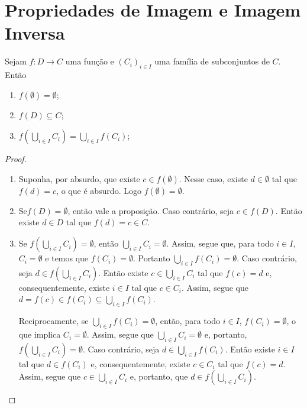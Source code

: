 \section{Propriedades de Imagem e Imagem Inversa}

\begin{prop}
	Sejam $f: D \to C$ uma função e $(C_i)_{i \in I}$ uma família de subconjuntos de $C$. Então
	\begin{enumerate}
	\item $f(\emptyset) = \emptyset$;
	\item $f(D) \subseteq C$;
	\item $f\left(\displaystyle\bigcup_{i \in I} C_i \right) = \displaystyle\bigcup_{i \in I} f(C_i)$;
	\end{enumerate}
\end{prop}
\begin{proof}
	\begin{enumerate}
	\item Suponha, por absurdo, que existe $c \in f(\emptyset)$. Nesse caso, existe $d \in \emptyset$ tal que $f(d) = c$, o que é absurdo. Logo $f(\emptyset) = \emptyset$.
	\item Se$f(D)=\emptyset$, então vale a proposição. Caso contrário, seja $c \in f(D)$. Então existe $d \in D$ tal que $f(d)=c \in C$.
	\item Se $f \left( \bigcup_{i \in I} C_i \right) = \emptyset$, então $\bigcup_{i \in I} C_i = \emptyset$. Assim, segue que, para todo $i \in I$, $C_i = \emptyset$ e temos que $f(C_i)=\emptyset$. Portanto $\bigcup_{i \in I} f(C_i) = \emptyset$. Caso contrário, seja $d \in f \left( \bigcup_{i \in I} C_i \right)$. Então existe $c \in \bigcup_{i \in I} C_i$ tal que $f(c)=d$ e, consequentemente, existe $i \in I$ tal que $c \in C_i$. Assim, segue que $d=f(c) \in f(C_i) \subseteq \bigcup_{i \in I} f(C_i)$.
	
	Reciprocamente, se $\bigcup_{i \in I} f(C_i) = \emptyset$, então, para todo $i \in I$, $f(C_i) = \emptyset$, o que implica $C_i = \emptyset$. Assim, segue que $\bigcup_{i \in I} C_i = \emptyset$ e, portanto, $f\left(\bigcup_{i \in I} C_i \right) = \emptyset$. Caso contrário, seja $d \in \bigcup_{i \in I} f(C_i)$. Então existe $i \in I$ tal que $d \in f(C_i)$ e, consequentemente, existe $c \in C_i$ tal que $f(c)=d$. Assim, segue que $c \in \bigcup_{i \in I} C_i$ e, portanto, que $d \in f\left(\bigcup_{i \in I} C_i \right)$.
	\end{enumerate}
\end{proof}

